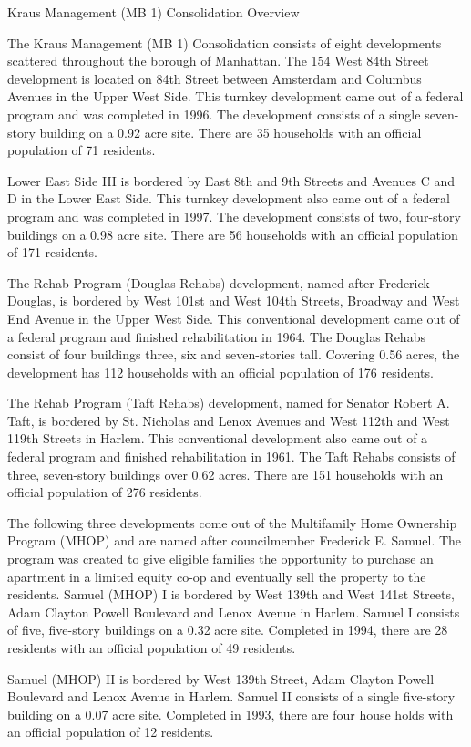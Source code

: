 Kraus Management (MB 1) Consolidation Overview

The Kraus Management (MB 1) Consolidation consists of eight developments scattered throughout the borough of Manhattan. The 154 West 84th Street development is located on 84th Street between Amsterdam and Columbus Avenues in the Upper West Side. This turnkey development came out of a federal program and was completed in 1996. The development consists of a single seven-story building on a 0.92 acre site. There are 35 households with an official population of 71 residents. 

Lower East Side III is bordered by East 8th and 9th Streets and Avenues C and D in the Lower East Side. This turnkey development also came out of a federal program and was completed in 1997. The development consists of two, four-story buildings on a 0.98 acre site. There are 56 households with an official population of 171 residents.

The Rehab Program (Douglas Rehabs) development, named after Frederick Douglas, is bordered by West 101st and West 104th Streets, Broadway and West End Avenue in the Upper West Side. This conventional development came out of a federal program and finished rehabilitation in 1964. The Douglas Rehabs consist of four buildings three, six and seven-stories tall. Covering 0.56 acres, the development has 112 households with an official population of 176 residents. 

The Rehab Program (Taft Rehabs) development, named for Senator Robert A. Taft, is bordered by St. Nicholas and Lenox Avenues and West 112th and West 119th Streets in Harlem. This conventional development also came out of a federal program and finished rehabilitation in 1961. The Taft Rehabs consists of three, seven-story buildings over 0.62 acres. There are 151 households with an official population of 276 residents.

The following three developments come out of the Multifamily Home Ownership Program (MHOP) and are named after councilmember Frederick E. Samuel. The program was created to give eligible families the opportunity to purchase an apartment in a limited equity co-op and eventually sell the property to the residents. Samuel (MHOP) I is bordered by West 139th and West 141st Streets, Adam Clayton Powell Boulevard and Lenox Avenue in Harlem. Samuel I consists of five, five-story buildings on a 0.32 acre site. Completed in 1994, there are 28 residents with an official population of 49 residents. 

Samuel (MHOP) II is bordered by West 139th Street, Adam Clayton Powell Boulevard and Lenox Avenue in Harlem. Samuel II consists of a single five-story building on a 0.07 acre site. Completed in 1993, there are four house holds with an official population of 12 residents.

